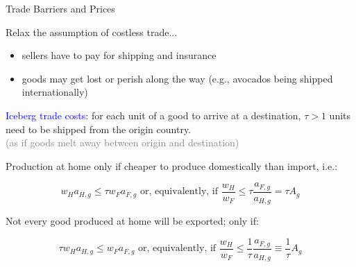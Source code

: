 \documentclass[notes,11pt, aspectratio=169, xcolor=table]{beamer}
\newcommand{\blue}[1]{\textcolor{blue}{#1}}
\newenvironment{wideitemize}{\itemize\addtolength{\itemsep}{10pt}}{\enditemize}
\begin{document}
\begin{frame}{Trade Barriers and Prices}
\begin{wideitemize}
    \item<1-> Relax the assumption of costless trade...
    \begin{itemize}
        \item sellers have to pay for shipping and insurance
        \item goods may get lost or perish along the way (e.g., avocados being shipped internationally)
    \end{itemize}
    \item<2-> \blue{Iceberg trade costs}: for each unit of a good to arrive at a destination, $\tau>1$ units need to be shipped from the origin country. \\
    \qquad \textcolor{gray}{(as if goods melt away between origin and destination)}

    \item<3-> Production at home only if cheaper to produce domestically than import, i.e.: 

    \begin{equation*}
        w_H a_{H,g} \le \tau w_F a_{F,g} \text{ or, equivalently, if } \frac{w_H}{w_F} \le  \tau  \frac{a_{F,g}}{a_{H,g}} = \tau A_g
    \end{equation*}

    \item<4-> Not every good produced at home will be exported; only if:

\begin{equation*}
        \tau w_H a_{H,g} \le w_F a_{F,g} \text{ or, equivalently, if } \frac{w_H}{w_F} \le  \frac{1}{\tau} \frac{a_{F,g}}{a_{H,g}} \equiv \frac{1}{\tau} A_g
\end{equation*}

    

    \end{wideitemize}
\end{frame}
\end{document}
